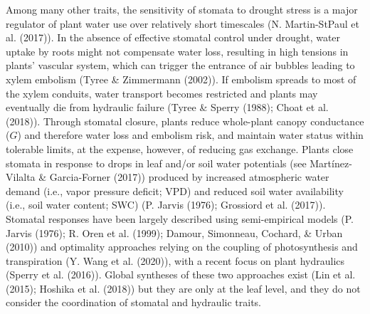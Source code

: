 \documentclass[11pt,twoside]{reedthesis}
\begin{document}
Among many other traits, the sensitivity of stomata to drought stress is
a major regulator of plant water use over relatively short timescales
(N. Martin-StPaul et al. (2017)). In the absence of effective stomatal
control under drought, water uptake by roots might not compensate water
loss, resulting in high tensions in plants' vascular system, which can
trigger the entrance of air bubbles leading to xylem embolism (Tyree \&
Zimmermann (2002)). If embolism spreads to most of the xylem conduits,
water transport becomes restricted and plants may eventually die from
hydraulic failure (Tyree \& Sperry (1988); Choat et al. (2018)). Through
stomatal closure, plants reduce whole-plant canopy conductance (\(G\))
and therefore water loss and embolism risk, and maintain water status
within tolerable limits, at the expense, however, of reducing gas
exchange. Plants close stomata in response to drops in leaf and/or soil
water potentials (see Martínez-Vilalta \& Garcia-Forner (2017)) produced
by increased atmospheric water demand (i.e., vapor pressure deficit;
VPD) and reduced soil water availability (i.e., soil water content; SWC)
(P. Jarvis (1976); Grossiord et al. (2017)). Stomatal responses have
been largely described using semi-empirical models (P. Jarvis (1976); R.
Oren et al. (1999); Damour, Simonneau, Cochard, \& Urban (2010)) and
optimality approaches relying on the coupling of photosynthesis and
transpiration (Y. Wang et al. (2020)), with a recent focus on plant
hydraulics (Sperry et al. (2016)). Global syntheses of these two
approaches exist (Lin et al. (2015); Hoshika et al. (2018)) but they are
only at the leaf level, and they do not consider the coordination of
stomatal and hydraulic traits.\par 
\end{document}
